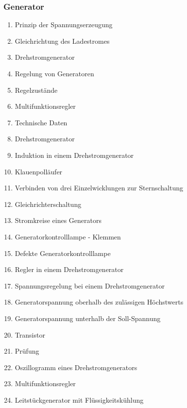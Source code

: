 \subsubsection{Generator}\label{generator}

\begin{enumerate}
\item
  Prinzip der Spannungserzeugung\\
\item
  Gleichrichtung des Ladestromes\\
\item
  Drehstromgenerator\\
\item
  Regelung von Generatoren\\
\item
  Regelzustände\\
\item
  Multifunktionsregler\\
\item
  Technische Daten\\
\item
  Drehstromgenerator\\
\item
  Induktion in einem Drehstromgenerator\\
\item
  Klauenpolläufer\\
\item
  Verbinden von drei Einzelwicklungen zur Sternschaltung\\
\item
  Gleichrichterschaltung\\
\item
  Stromkreise eines Generators\\
\item
  Generatorkontrolllampe - Klemmen\\
\item
  Defekte Generatorkontrolllampe\\
\item
  Regler in einem Drehstromgenerator\\
\item
  Spannungsregelung bei einem Drehstromgenerator\\
\item
  Generatorspannung oberhalb des zulässigen Höchstwerts\\
\item
  Generatorspannung unterhalb der Soll-Spannung\\
\item
  Transistor\\
\item
  Prüfung\\
\item
  Oszillogramm eines Drehstromgenerators\\
\item
  Multifunktionsregler\\
\item
  Leitstückgenerator mit Flüssigkeitskühlung
\end{enumerate}

